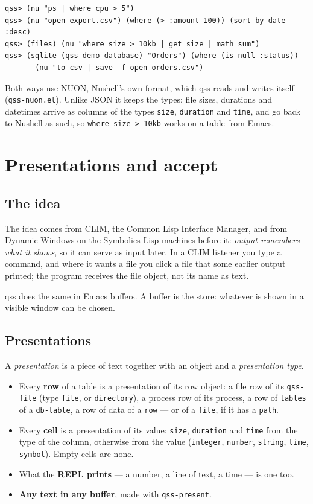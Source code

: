 \documentclass[
  paper=a4, fontsize=11pt, parskip=half, headings=small,
  toc=bibliography, numbers=noenddot, DIV=12
]{scrreprt}
\newcommand{\code}[1]{\texttt{#1}}
\newcommand{\file}[1]{\texttt{#1}}
\newcommand{\qss}{\textsf{qss}}
\begin{document}
\begin{Verbatim}
qss> (nu "ps | where cpu > 5")
qss> (nu "open export.csv") (where (> :amount 100)) (sort-by date :desc)
qss> (files) (nu "where size > 10kb | get size | math sum")
qss> (sqlite (qss-demo-database) "Orders") (where (is-null :status))
       (nu "to csv | save -f open-orders.csv")
\end{Verbatim}

Both ways use NUON, Nushell's own format, which \qss{} reads and writes itself
(\file{qss-nuon.el}). Unlike JSON it keeps the types: file sizes, durations and
datetimes arrive as columns of the types \code{size}, \code{duration} and
\code{time}, and go back to Nushell as such, so \code{where size > 10kb} works
on a table from Emacs.

\chapter{Presentations and accept}\label{chap:present}

\section{The idea}

The idea comes from CLIM, the Common Lisp Interface Manager, and from Dynamic
Windows on the Symbolics Lisp machines before it: \emph{output remembers what it
shows}, so it can serve as input later. In a CLIM listener you type a command,
and where it wants a file you click a file that some earlier output printed;
the program receives the file object, not its name as text.

\qss{} does the same in Emacs buffers. A buffer is the store: whatever is
shown in a visible window can be chosen.

\section{Presentations}

A \emph{presentation} is a piece of text together with an object and a
\emph{presentation type}.

\begin{itemize}
\item Every \textbf{row} of a table is a presentation of its row object: a file
  row of its \code{qss-file} (type \code{file}, or \code{directory}), a process
  row of its process, a row of \code{tables} of a \code{db-table}, a row of data
  of a \code{row} --- or of a \code{file}, if it has a \code{path}.
\item Every \textbf{cell} is a presentation of its value: \code{size},
  \code{duration} and \code{time} from the type of the column, otherwise from
  the value (\code{integer}, \code{number}, \code{string}, \code{time},
  \code{symbol}). Empty cells are none.
\item What the \textbf{REPL prints} --- a number, a line of text, a time --- is
  one too.
\item \textbf{Any text in any buffer}, made with \code{qss-present}.
\end{itemize}
\end{document}
